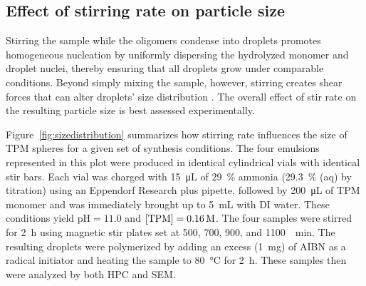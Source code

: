 \documentclass[journal=langd5,manuscript=article]{achemso}
\begin{document}
\subsection{Effect of stirring rate on particle size}
\label{sec:stir}

Stirring the sample while the oligomers condense into droplets promotes
homogeneous nucleation by uniformly dispersing the hydrolyzed monomer
and droplet nuclei, thereby ensuring that all droplets grow under
comparable conditions.
Beyond simply mixing the sample, however, stirring creates shear
forces \cite{halasz2007vortex} that can alter droplets' size
distribution \cite{oles1992shear,eggersdorfer2010fragmentation}.
The overall effect of stir rate on the resulting particle size
is best assessed experimentally.

Figure~\ref{fig:sizedistribution} summarizes how
stirring rate influences the size
of TPM spheres for a given set of synthesis conditions.
The four emulsions represented in this plot
were produced in identical cylindrical 
vials with identical stir bars. 
Each vial was charged with
\SI{15}{\micro\liter} of \SI{29}{\percent} ammonia 
(\SI{29.3}{\percent} (aq) by  titration) 
using an Eppendorf Research plus pipette, followed by
\SI{200}{\micro\liter} of TPM monomer and was immediately
brought up to \SI{5}{\milli\liter} with DI water.
These conditions yield $\text{pH} = \num{11.0}$ and
$[\ce{TPM}] = \SI{0.16}{M}$.
The four samples were stirred for \SI{2}{\hour}
using magnetic stir plates set at \num{500}, \num{700}, \num{900}, and
\SI{1100}{\per\minute}. 
The resulting droplets were polymerized by adding an excess (\SI{1}{mg}) of AIBN
as a radical initiator and
heating the sample to \SI{80}{\celsius} for \SI{2}{\hour}.
These samples then were analyzed by both HPC and SEM.
\end{document}
